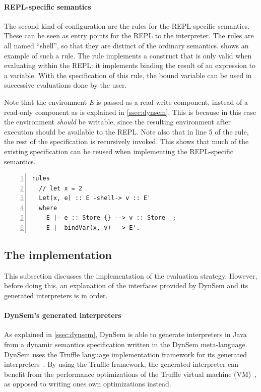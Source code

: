 \paragraph{REPL-specific semantics} The second kind of configuration are the
rules for the REPL-specific semantics. These can be seen as entry points for the
REPL to the interpreter. The rules are all named ``shell'', so that they are
distinct of the ordinary semantics.  shows an example of
such a rule. The rule implements a construct that is only valid when evaluating
within the REPL: it implements binding the result of an expression to a
variable. With the specification of this rule, the bound variable can be used in
successive evaluations done by the user.

Note that the environment \textit{E} is passed as a read-write component,
instead of a read-only component as is explained in \cref{ssec:dynsem}. This is
because in this case the environment \emph{should} be writable, since the
resulting environment after execution should be available to the REPL. Note also
that in line 5 of the rule, the rest of the specification is recursively
invoked. This shows that much of the existing specification can be reused when
implementing the REPL-specific semantics.

\begin{minipage}{\textwidth}
\begin{lstlisting}[language=dynsem,caption={A rule specifying semantics specific
to the REPL.},label={lst:shell-rule},numbers=left]
rules
  // let x = 2
  Let(x, e) :: E -shell-> v :: E'
  where
    E |- e :: Store {} --> v :: Store _;
    E |- bindVar(x, v) --> E'.
\end{lstlisting}
\end{minipage}

\subsection{The implementation}
\label{ssec:implementation}
This subsection discusses the implementation of the evaluation
strategy. However, before doing this, an explanation of the interfaces provided
by DynSem and its generated interpreters is in order.

\paragraph{DynSem's generated interpreters} As explained in \cref{ssec:dynsem},
DynSem is able to generate interpreters in Java from a dynamic semantics
specification written in the DynSem meta-language. DynSem uses the Truffle
language implementation framework for its generated
interpreters~\cite{Humer14}. By using the Truffle framework, the generated
interpreter can benefit from the performance optimizations of the Truffle
virtual machine (VM)~\cite{Wurthinger13}, as opposed to writing ones own
optimizations instead.

